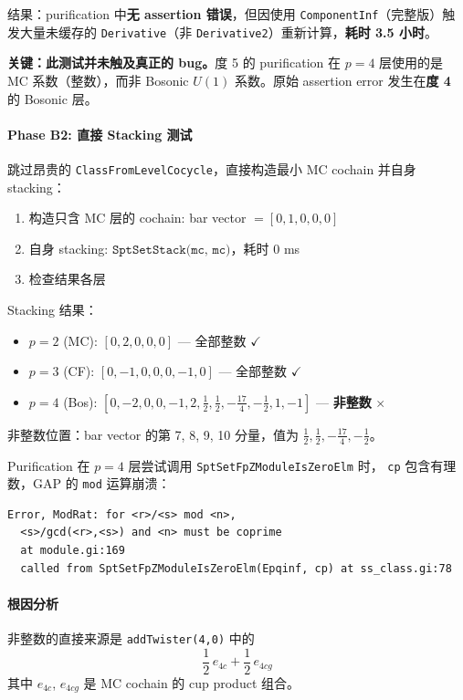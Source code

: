 \documentclass[a4paper,fontset=ubuntu,12pt]{ctexart}
\begin{document}
结果：purification 中\textbf{无 assertion 错误}，但因使用 \texttt{ComponentInf}（完整版）触发大量未缓存的 \texttt{Derivative}（非 \texttt{Derivative2}）重新计算，\textbf{耗时 3.5 小时}。

\textbf{关键：此测试并未触及真正的 bug。}度 5 的 purification 在 $p=4$ 层使用的是 MC 系数（整数），而非 Bosonic $U(1)$ 系数。原始 assertion error 发生在\textbf{度 4} 的 Bosonic 层。

\paragraph{Phase B2: 直接 Stacking 测试}

跳过昂贵的 \texttt{ClassFromLevelCocycle}，直接构造最小 MC cochain 并自身 stacking：
\begin{enumerate}
\item 构造只含 MC 层的 cochain: bar vector $=[0,1,0,0,0]$
\item 自身 stacking: $\texttt{SptSetStack(mc, mc)}$，耗时 0 ms
\item 检查结果各层
\end{enumerate}

Stacking 结果：
\begin{itemize}
\item $p=2$ (MC): $[0, 2, 0, 0, 0]$ — 全部整数 $\checkmark$
\item $p=3$ (CF): $[0, -1, 0, 0, 0, -1, 0]$ — 全部整数 $\checkmark$
\item $p=4$ (Bos): $[0, -2, 0, 0, -1, 2, \frac{1}{2}, \frac{1}{2}, -\frac{17}{4}, -\frac{1}{2}, 1, -1]$ — \textbf{非整数} $\times$
\end{itemize}

非整数位置：bar vector 的第 7, 8, 9, 10 分量，值为 $\frac{1}{2}, \frac{1}{2}, -\frac{17}{4}, -\frac{1}{2}$。

Purification 在 $p=4$ 层尝试调用 \texttt{SptSetFpZModuleIsZeroElm} 时，
\texttt{cp} 包含有理数，GAP 的 \texttt{mod} 运算崩溃：
\begin{verbatim}
Error, ModRat: for <r>/<s> mod <n>,
  <s>/gcd(<r>,<s>) and <n> must be coprime
  at module.gi:169
  called from SptSetFpZModuleIsZeroElm(Epqinf, cp) at ss_class.gi:78
\end{verbatim}

\paragraph{根因分析}

非整数的直接来源是 \texttt{addTwister(4,0)} 中的
\begin{equation}
\frac{1}{2}\,e_{4c} + \frac{1}{2}\,e_{4cg}
\end{equation}
其中 $e_{4c}$, $e_{4cg}$ 是 MC cochain 的 cup product 组合。
\end{document}
